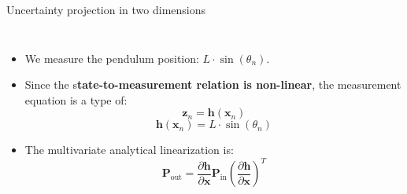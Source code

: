 \begin{frame}{Uncertainty projection in two dimensions}
\begin{columns}
\begin{itemize}
\item We measure the pendulum position: $L \cdot \sin(\theta_n)$.

\item Since the s\textbf{tate-to-measurement relation is non-linear}, the measurement equation is a type of:
\[
\mathbf{z}_n = \mathbf{h}(\mathbf{x}_n)
\]
\[
\mathbf{h}(\mathbf{x}_n) = L \cdot \sin(\theta_n)
\]

\item The multivariate analytical linearization is:
\[
\mathbf{P}_{\text{out}} = \frac{\partial \mathbf{h}}{\partial \mathbf{x}} \mathbf{P}_{\text{in}} \left( \frac{\partial \mathbf{h}}{\partial \mathbf{x}} \right)^T
\]

\end{itemize}
\end{columns}
\end{frame}


